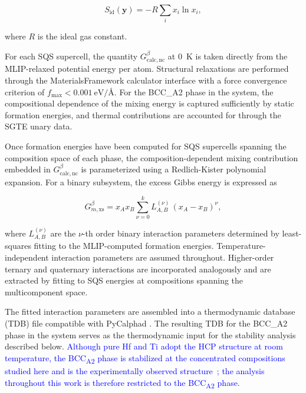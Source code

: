 \begin{equation}\label{eq:conf_entropy}
    S_{\mathrm{id}}(\boldsymbol{y}) = -R\sum_i x_i\ln x_i,
\end{equation}

where $R$ is the ideal gas constant.

For each SQS supercell, the quantity $G^\beta_{\mathrm{calc,nc}}$ at \SI{0}{\kelvin} is taken directly from the MLIP-relaxed potential energy per atom. Structural relaxations are performed through the MaterialsFramework calculator interface \cite{sariturk_2025_15731044} with a force convergence criterion of $f_{\mathrm{max}} < \SI{0.001}{\electronvolt/\angstrom}$. For the BCC\_A2 phase in the  system, the compositional dependence of the mixing energy is captured sufficiently by static formation energies, and thermal contributions are accounted for through the SGTE unary data.

Once formation energies have been computed for SQS supercells spanning the composition space of each phase, the composition-dependent mixing contribution embedded in $G^\beta_{\mathrm{calc,nc}}$ is parameterized using a Redlich-Kister polynomial expansion. For a binary  subsystem, the excess Gibbs energy is expressed as

\begin{equation}\label{eq:rk}
    G^\beta_{m,\mathrm{xs}} = x_A x_B \sum_{\nu=0}^{k} L^{(\nu)}_{A,B}\,(x_A - x_B)^\nu,
\end{equation}

where $L^{(\nu)}_{A,B}$ are the $\nu$-th order binary interaction parameters determined by least-squares fitting to the MLIP-computed formation energies. Temperature-independent interaction parameters are assumed throughout. Higher-order ternary and quaternary interactions are incorporated analogously and are extracted by fitting to SQS energies at compositions spanning the multicomponent space.

The fitted interaction parameters are assembled into a thermodynamic database (TDB) file compatible with PyCalphad \cite{otis2017pycalphad}. The resulting TDB for the BCC\_A2 phase in the  system serves as the thermodynamic input for the stability analysis described below.
\textcolor{blue}{Although pure Hf and Ti adopt the HCP structure at room temperature, the BCC\textsubscript{A2} phase is stabilized at the concentrated compositions studied here and is the experimentally observed structure~\cite{an2021spinodal}; the analysis throughout this work is therefore restricted to the BCC\textsubscript{A2} phase.}

